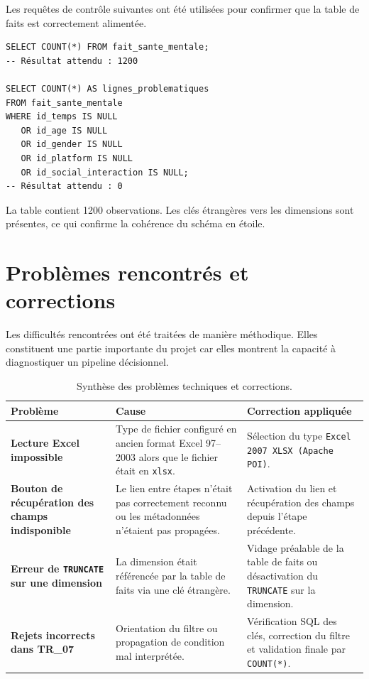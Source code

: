 \documentclass[11pt,a4paper]{report}
\newcommand{\db}[1]{\begingroup\ttfamily\scriptsize\detokenize{#1}\endgroup}
\begin{document}
Les requêtes de contrôle suivantes ont été utilisées pour confirmer que la table de faits est correctement alimentée.

\begin{codebox}
\begin{lstlisting}[style=sqlstyle]
SELECT COUNT(*) FROM fait_sante_mentale;
-- Résultat attendu : 1200

SELECT COUNT(*) AS lignes_problematiques
FROM fait_sante_mentale
WHERE id_temps IS NULL
   OR id_age IS NULL
   OR id_gender IS NULL
   OR id_platform IS NULL
   OR id_social_interaction IS NULL;
-- Résultat attendu : 0
\end{lstlisting}
\end{codebox}

\begin{resultbox}
La table \db{fait_sante_mentale} contient 1200 observations. Les clés étrangères vers les dimensions sont présentes, ce qui confirme la cohérence du schéma en étoile.
\end{resultbox}
\clearpage %
\section{Problèmes rencontrés et corrections}

Les difficultés rencontrées ont été traitées de manière méthodique. Elles constituent une partie importante du projet car elles montrent la capacité à diagnostiquer un pipeline décisionnel.

\begin{table}[H]
\centering
\renewcommand{\arraystretch}{1.25}
\small
\begin{tabularx}{\linewidth}{>{\bfseries}p{3.5cm}Y Y}
\toprule
Problème & Cause & Correction appliquée \\
\midrule
Lecture Excel impossible & Type de fichier configuré en ancien format Excel 97--2003 alors que le fichier était en \texttt{xlsx}. & Sélection du type \texttt{Excel 2007 XLSX (Apache POI)}. \\
Bouton de récupération des champs indisponible & Le lien entre étapes n'était pas correctement reconnu ou les métadonnées n'étaient pas propagées. & Activation du lien et récupération des champs depuis l'étape précédente. \\
Erreur de \texttt{TRUNCATE} sur une dimension & La dimension était référencée par la table de faits via une clé étrangère. & Vidage préalable de la table de faits ou désactivation du \texttt{TRUNCATE} sur la dimension. \\
Rejets incorrects dans TR\_07 & Orientation du filtre ou propagation de condition mal interprétée. & Vérification SQL des clés, correction du filtre et validation finale par \texttt{COUNT(*)}. \\
\bottomrule
\end{tabularx}
\caption{Synthèse des problèmes techniques et corrections.}
\end{table}
\end{document}
